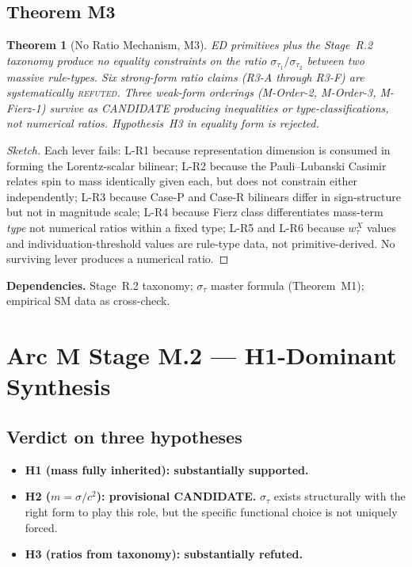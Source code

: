 \documentclass[11pt,a4paper]{article}
\newtheorem{theorem}{Theorem}[section]
\begin{document}
\subsection{Theorem M3}

\begin{theorem}[No Ratio Mechanism, M3]
ED primitives plus the Stage~R.2 taxonomy produce no equality constraints on the ratio $\sigma_{\tau_1}/\sigma_{\tau_2}$ between two massive rule-types. Six strong-form ratio claims (R3-A through R3-F) are systematically \textsc{refuted}. Three weak-form orderings (M-Order-2, M-Order-3, M-Fierz-1) survive as CANDIDATE producing inequalities or type-classifications, not numerical ratios. Hypothesis~H3 in equality form is rejected.
\end{theorem}

\begin{proof}[Sketch]
Each lever fails: L-R1 because representation dimension is consumed in forming the Lorentz-scalar bilinear; L-R2 because the Pauli--Lubanski Casimir relates spin to mass identically given each, but does not constrain either independently; L-R3 because Case-P and Case-R bilinears differ in sign-structure but not in magnitude scale; L-R4 because Fierz class differentiates mass-term \emph{type} not numerical ratios within a fixed type; L-R5 and L-R6 because $w_\tau^X$ values and individuation-threshold values are rule-type data, not primitive-derived. No surviving lever produces a numerical ratio.
\end{proof}

\textbf{Dependencies.} Stage~R.2 taxonomy; $\sigma_\tau$ master formula (Theorem~M1); empirical SM data as cross-check.

\section{Arc M Stage M.2 --- H1-Dominant Synthesis}

\subsection{Verdict on three hypotheses}

\begin{itemize}
  \item \textbf{H1 (mass fully inherited): substantially supported.}
  \item \textbf{H2 ($m = \sigma/c^2$): provisional CANDIDATE.} $\sigma_\tau$ exists structurally with the right form to play this role, but the specific functional choice is not uniquely forced.
  \item \textbf{H3 (ratios from taxonomy): substantially refuted.}
\end{itemize}
\end{document}
